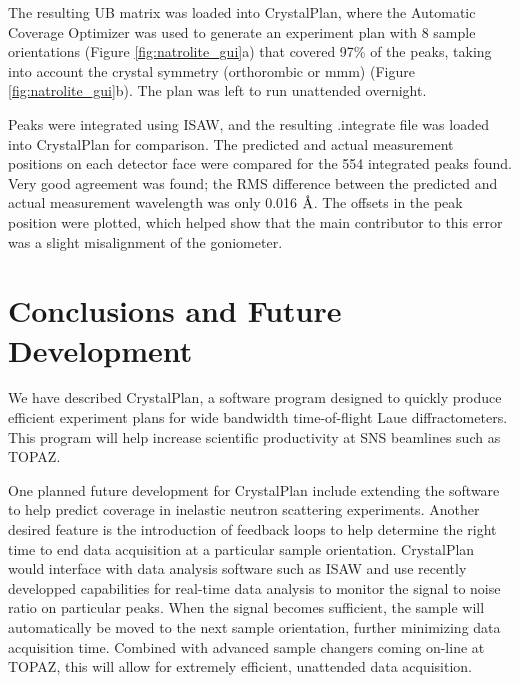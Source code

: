 \documentclass[final]{iucr}              %
\newcommand{\ang}{$\mathrm{\AA} $}
\begin{document}
The resulting UB matrix was loaded into CrystalPlan, where the Automatic
Coverage Optimizer was used to generate an experiment plan with 8 sample
orientations (Figure \ref{fig:natrolite_gui}a) that covered 97\% of the peaks,
taking into account the crystal symmetry (orthorombic or mmm) (Figure
\ref{fig:natrolite_gui}b). The plan was left to run unattended overnight.

Peaks were integrated using ISAW, and the resulting .integrate file was loaded
into CrystalPlan for comparison. The predicted and actual measurement
positions on each detector face were compared for the 554 integrated peaks
found. Very good agreement was found; the
RMS difference between the predicted and actual measurement wavelength was only
0.016 \ang. The offsets in the peak position were plotted, which
helped show that the main contributor to this error was a slight misalignment of
the goniometer.





\section{Conclusions and Future Development}

We have described CrystalPlan, a software program designed to quickly produce
efficient experiment plans for wide bandwidth time-of-flight Laue
diffractometers. This program will help increase scientific productivity at SNS
beamlines such as TOPAZ.

One planned future development for CrystalPlan include extending the software
to help predict coverage in inelastic neutron scattering experiments. Another
desired feature is the introduction of feedback loops to help determine the
right time to end data acquisition at a particular sample orientation.
CrystalPlan would interface with data analysis software such as ISAW and use
recently developped capabilities for real-time data analysis to monitor
the  signal to noise ratio on particular peaks. When the signal becomes
sufficient, the sample will automatically be moved to the next sample
orientation, further minimizing data acquisition time. Combined with advanced
sample changers coming on-line at TOPAZ, this will allow for extremely
efficient, unattended data acquisition.
\end{document}
